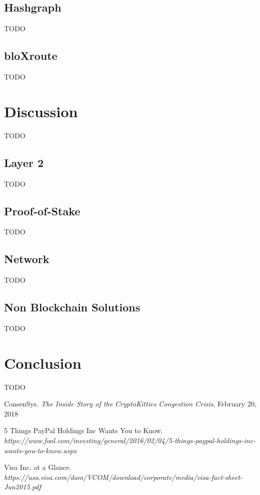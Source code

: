 \documentclass{article}
\begin{document}
\subsection{Hashgraph}
TODO

\subsection{bloXroute}
TODO


\section{Discussion}
TODO

\subsection{Layer 2}
TODO

\subsection{Proof-of-Stake}
TODO

\subsection{Network}
TODO

\subsection{Non Blockchain Solutions}
TODO

\section{Conclusion}
TODO

\begin{thebibliography}{1}

ConsenSys. 
\textit{The Inside Story of the CryptoKitties Congestion Crisis}, February 20, 2018

5 Things PayPal Holdings Inc Wants You to Know.
\textit{https://www.fool.com/investing/general/2016/02/04/5-things-paypal-holdings-inc-wants-you-to-know.aspx}

Visa Inc. at a Glance.
\textit{https://usa.visa.com/dam/VCOM/download/corporate/media/visa-fact-sheet-Jun2015.pdf}


\end{thebibliography}
\end{document}
